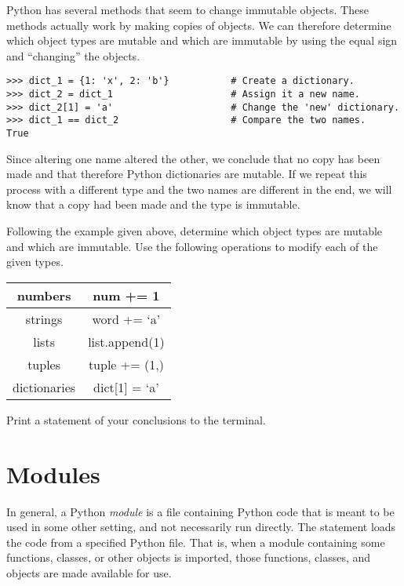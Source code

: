 \begin{problem}
Python has several methods that seem to change immutable objects.
These methods actually work by making copies of objects.
We can therefore determine which object types are mutable and which are immutable by using the equal sign and ``changing'' the objects.

\begin{lstlisting}
>>> dict_1 = {1: 'x', 2: 'b'}           # Create a dictionary.
>>> dict_2 = dict_1                     # Assign it a new name.
>>> dict_2[1] = 'a'                     # Change the 'new' dictionary.
>>> dict_1 == dict_2                    # Compare the two names.
True
\end{lstlisting}

Since altering one name altered the other, we conclude that no copy has been made and that therefore Python dictionaries are mutable.
If we repeat this process with a different type and the two names are different in the end, we will know that a copy had been made and the type is immutable.

Following the example given above, determine which object types are mutable and which are immutable.
Use the following operations to modify each of the given types.

\begin{center}
\begin{tabular}{|c|c|}
\hline
numbers & num += 1 \\
\hline
strings & word += `a' \\
\hline
lists & list.append(1) \\
\hline
tuples & tuple += (1,) \\
\hline
dictionaries & dict[1] = `a' \\
\hline
\end{tabular}
\end{center}
Print a statement of your conclusions to the terminal.
\end{problem}

\section*{Modules}

In general, a Python \emph{module} is a file containing Python code that is meant to be used in some other setting, and not necessarily run directly.
The  statement loads the code from a specified Python file.
That is, when a module containing some functions, classes, or other objects is imported, those functions, classes, and objects are made available for use.

